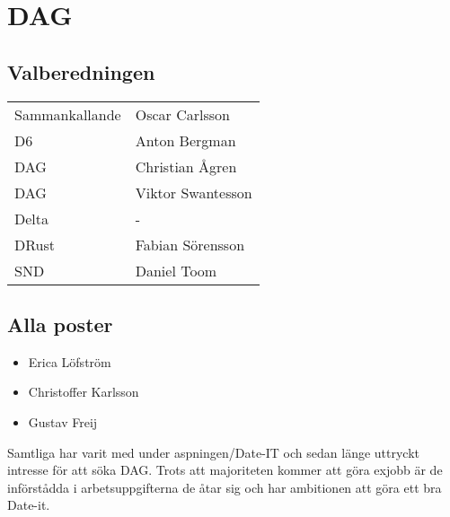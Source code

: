 \section{DAG}


\subsection{Valberedningen}
\begin{autoframe}

\begin{tabular}{ll}
Sammankallande & Oscar Carlsson \\
D6 & Anton Bergman \\
DAG  & Christian Ågren \\
DAG  & Viktor Swantesson \\
Delta  & - \\
DRust & Fabian Sörensson \\
SND  & Daniel Toom
\end{tabular}
\end{autoframe}

\subsection{Alla poster}

\begin{autoframe}
\begin{itemize}
\item Erica Löfström
\item Christoffer Karlsson
\item Gustav Freij
\end{itemize}


\bigskip
Samtliga har varit med under aspningen/Date-IT och sedan länge uttryckt intresse för att söka DAG. Trots att majoriteten kommer att göra exjobb är de införstådda i arbetsuppgifterna de åtar sig och har ambitionen att göra ett bra Date-it.
\end{autoframe}
